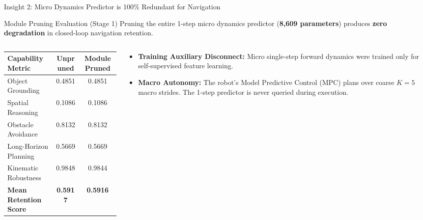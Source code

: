 \documentclass[aspectratio=169, 10pt]{beamer}
\begin{document}
\begin{frame}{Insight 2: Micro Dynamics Predictor is 100\% Redundant for Navigation}
  \begin{block}{Module Pruning Evaluation (Stage 1)}
    Pruning the entire 1-step micro dynamics predictor (\textbf{8,609 parameters}) produces \textbf{zero degradation} in closed-loop navigation retention.
  \end{block}
  \vspace{-0.2cm}
  \begin{columns}[T]
    \begin{column}{0.50\textwidth}
      \setlength{\tabcolsep}{4pt}
      \begin{table}
        \centering
        \scriptsize
        \begin{tabular}{lcc}
          \toprule
          \textbf{Capability Metric} & \textbf{Unpruned} & \textbf{Module Pruned} \\
          \midrule
          Object Grounding & 0.4851 & 0.4851 \\
          Spatial Reasoning & 0.1086 & 0.1086 \\
          Obstacle Avoidance & 0.8132 & 0.8132 \\
          Long-Horizon Planning & 0.5669 & 0.5669 \\
          Kinematic Robustness & 0.9848 & 0.9844 \\
          \midrule
          \textbf{Mean Retention Score} & \textbf{0.5917} & \textbf{0.5916} \\
          \bottomrule
        \end{tabular}
      \end{table}
    \end{column}
    \begin{column}{0.46\textwidth}
      \begin{itemize}
        \item \textbf{Training Auxiliary Disconnect:} Micro single-step forward dynamics were trained only for self-supervised feature learning.
        \item \textbf{Macro Autonomy:} The robot's Model Predictive Control (MPC) plans over coarse $K=5$ macro strides. The 1-step predictor is never queried during execution.
      \end{itemize}
    \end{column}
  \end{columns}
\end{frame}
\end{document}
